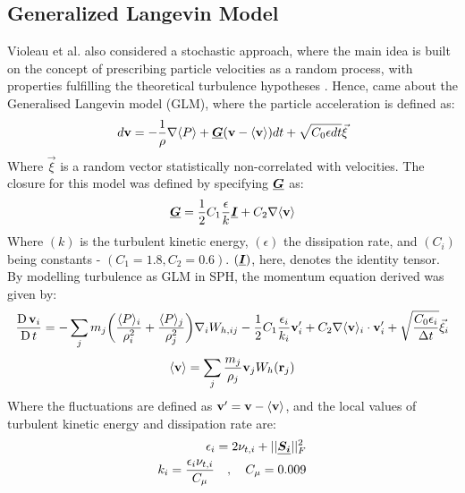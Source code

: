 \subsection{Generalized Langevin Model}
Violeau et al. \parencite{VIOLEAU2002} also considered a stochastic approach, where the main idea is built on the concept of prescribing particle velocities as a random process, with properties fulfilling the theoretical turbulence hypotheses \parencite{pope1994lagrangi}. Hence, came about the Generalised Langevin model (GLM), where the particle acceleration is defined as:
\begin{equation}
    d\mathbf{v} = -\frac{1}{\rho} \nabla \langle P \rangle + \underline{\bm{G}}(\mathbf{v} - \langle \mathbf{v} \rangle)dt + \sqrt{C_0 \epsilon dt}\Vec{\xi}
    \label{eq:violeau-glm-particle-accel}
\end{equation}
Where $\Vec{\xi}$ is a random vector statistically non-correlated with velocities. The closure for this model was defined by specifying $\underline{\bm{G}}$ as:
\begin{equation}
    \underline{\bm{G}} = \frac{1}{2} C_1 \frac{\epsilon}{k}\underline{\bm{I}} + C_2 \nabla \langle \mathbf{v} \rangle
\end{equation}
Where $(k)$ is the turbulent kinetic energy, $(\epsilon)$ the dissipation rate, and $(C_i)$ being constants - $(C_1=1.8, C_2=0.6)$. $(\underline{\bm{I}})$, here, denotes the identity tensor.
By modelling turbulence as GLM in SPH, the momentum equation derived was given by:
\begin{equation}
    \frac{\operatorname{D} \mathbf{v}_i}{\operatorname{D} t} = -\sum_j m_j \bigg( \frac{\langle P \rangle_i}{\rho_i^2} + \frac{\langle P \rangle_j}{\rho_j^2} \bigg) \nabla_{i} W_{h, ij} - \frac{1}{2} C_1 \frac{\epsilon_i}{k_i} \mathbf{v}'_i + C_2 \nabla \langle \mathbf{v} \rangle_i \cdot \mathbf{v}'_i + \sqrt{\frac{C_0 \epsilon_i}{\Delta t}} \Vec{\xi}_i
    \label{eq:violeau-mom-glm}
\end{equation}
\begin{equation}
    \langle \mathbf{v} \rangle = \sum_j \frac{m_j}{\rho_j}\mathbf{v}_j W_h (\mathbf{r}_j)
    \label{eq:violeau-ra-vel}
\end{equation}
Where the fluctuations are defined as $\mathbf{v}' = \mathbf{v} - \langle \mathbf{v} \rangle$, and the local values of turbulent kinetic energy and dissipation rate are:
\begin{align}
    \epsilon_i = 2 \nu_{t, i} + 
    ||\underline{\bm{S_i}}||_F^2 \\
    k_i = \frac{\epsilon_i \nu_{t, i}}{C_{\mu}} \quad , \quad C_{\mu} = 0.009
    \label{eq:violeau-k-eps}
\end{align}

